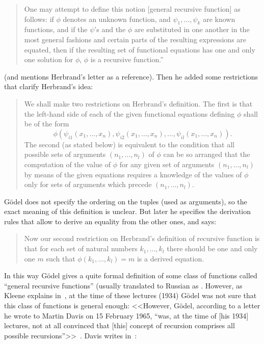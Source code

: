 \documentclass[12pt]{article}
\theoremstyle{remark}
\begin{document}
\begin{quote}
One may attempt to define this notion [general recursive function] as follows: if $\phi$ denotes an unknown function, and $\psi_1,\ldots,\psi_k$ are known functions, and if the $\psi$'s and the $\phi$ are substituted in one another in the most general fashions and certain parts of the resulting expressions are equated, then if the resulting set of functional equations has one and only one solution for $\phi$, $\phi$ is a recursive function.'' 
\end{quote}
(and mentions Herbrand's letter as a reference). Then he added some restrictions that clarify Herbrand's idea:
\begin{quote}
We shall make two restrictions on Herbrand's definition. The first is that the left-hand side of each of the given functional equations defining $\phi$ shall be of the form \[\phi(\psi_{i1}(x_1,\ldots,x_n),\psi_{i2}(x_1,\ldots,x_n),\ldots,\psi_{il}(x_1,\ldots,x_n)).\] The second (as stated below) is equivalent to the condition that all possible sets of arguments $(n_1,\ldots,n_l)$ of $\phi$ can be so arranged that the computation of the value of $\phi$ for any given set of arguments $(n_1,\ldots,n_l)$ by means of the given equations requires a knowledge of the values of $\phi$ only for sets of arguments which precede $(n_1,\ldots,n_l)$.
\end{quote}
G\"{o}del does not specify the ordering on the tuples (used as arguments), so the exact meaning of this definition is unclear. But later he specifies the derivation rules that allow to derive an equality from the other ones, and says:
%
  \begin{quote}
 Now our second restriction on Herbrand's definition of recursive function is that for each set of natural numbers $k_1,\ldots,k_l$ there should be one and only one $m$ such that $\phi(k_1,\ldots,k_l)=m$ is a derived equation.
\end{quote}
%
In this way G\"{o}del gives a quite formal definition of some class of functions called ``general recursive functions'' (usually translated to Russian as . However, as Kleene explains in~\cite{Kleene1981}, at the time of these lectures (1934) G\"{o}del was not sure that this class of functions is general enough: <<However, G\"{o}del, according to a letter he wrote to Martin Davis on 15 February 1965, ``was, at the time of [his 1934] lectures, not at all convinced that [this] concept of recursion comprises all possible recursions''>>~\cite[p.~48]{Kleene1981}. Davis writes in~\cite[p.~40]{Davis1965}:
\end{document}
